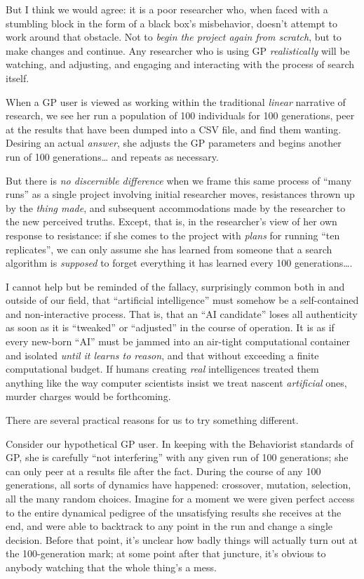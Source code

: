 But I think we would agree: it is a poor researcher who, when faced with a stumbling block in the form of a black box's misbehavior, doesn't attempt to work around that obstacle. Not to \emph{begin the project again from scratch}, but to make changes and continue. Any researcher who is using GP \emph{realistically} will be watching, and adjusting, and engaging and interacting with the process of search itself.

When a GP user is viewed as working within the traditional \emph{linear} narrative of research, we see her run a population of 100 individuals for 100 generations, peer at the results that have been dumped into a CSV file, and find them wanting. Desiring an actual \emph{answer}, she adjusts the GP parameters and begins another run of 100 generations\ldots{} and repeats as necessary.

But there is \emph{no discernible difference} when we frame this same process of ``many runs'' as a single project involving initial researcher moves, resistances thrown up by the \emph{thing made}, and subsequent accommodations made by the researcher to the new perceived truths. Except, that is, in the researcher's view of her own response to resistance: if she comes to the project with \emph{plans} for running ``ten replicates'', we can only assume she has learned from someone that a search algorithm is \emph{supposed} to forget everything it has learned every 100 generations\ldots{}.

I cannot help but be reminded of the fallacy, surprisingly common both in and outside of our field, that ``artificial intelligence'' must somehow be a self-contained and non-interactive process. That is, that an ``AI candidate'' loses all authenticity as soon as it is ``tweaked'' or ``adjusted'' in the course of operation. It is as if every new-born ``AI'' must be jammed into an air-tight computational container and isolated \emph{until it learns to reason}, and that without exceeding a finite computational budget. If humans creating \emph{real} intelligences treated them anything like the way computer scientists insist we treat nascent \emph{artificial} ones, murder charges would be forthcoming.

There are several practical reasons for us to try something different.

Consider our hypothetical GP user. In keeping with the Behaviorist standards of GP, she is carefully ``not interfering'' with any given run of 100 generations; she can only peer at a results file after the fact. During the course of any 100 generations, all sorts of dynamics have happened: crossover, mutation, selection, all the many random choices. Imagine for a moment we were given perfect access to the entire dynamical pedigree of the unsatisfying results she receives at the end, and were able to backtrack to any point in the run and change a single decision. Before that point, it's unclear how badly things will actually turn out at the 100-generation mark; at some point after that juncture, it's obvious to anybody watching that the whole thing's a mess.

